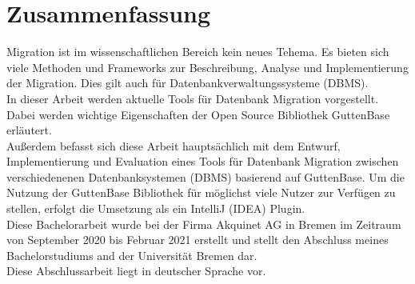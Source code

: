 \section*{Zusammenfassung}

Migration ist im wissenschaftlichen Bereich kein neues Tehema. Es bieten sich viele Methoden und Frameworks zur Beschreibung, Analyse und Implementierung der Migration. Dies gilt auch für Datenbankverwaltungssysteme (DBMS). \\ 
In dieser Arbeit werden aktuelle Tools für Datenbank Migration vorgestellt. Dabei werden wichtige Eigenschaften der Open Source Bibliothek GuttenBase erläutert.\\
Außerdem befasst sich diese Arbeit hauptsächlich mit dem Entwurf, Implementierung und Evaluation eines Tools für Datenbank Migration zwischen verschiedenenen Datenbanksystemen (DBMS) basierend auf GuttenBase.
Um die Nutzung der GuttenBase Bibliothek für möglichst viele Nutzer zur Verfügen zu stellen, erfolgt die Umsetzung als ein IntelliJ (IDEA) Plugin.\\ 
Diese Bachelorarbeit wurde bei der Firma Akquinet AG in Bremen im Zeitraum von September 2020 bis Februar 2021 erstellt und stellt den Abschluss meines Bachelorstudiums and der Universität Bremen dar. \\ 
Diese Abschlussarbeit liegt in deutscher Sprache vor.





